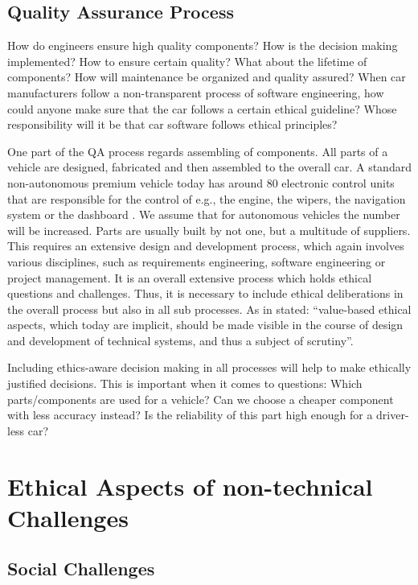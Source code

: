 \subsection{Quality Assurance Process}
\label{sec:EAofTC:QualityAssuranceProcess}

How do engineers ensure high quality components? How is the decision making implemented? How to ensure certain quality? What about the lifetime of components? How will maintenance be organized and quality assured?
When car manufacturers follow a non-transparent process of software engineering, how could anyone make sure that the car follows a certain ethical guideline? Whose responsibility will it be that car software follows ethical principles?

One part of the QA process regards assembling of components. All parts of a vehicle are designed, fabricated and then assembled to the overall car. A standard non-autonomous premium vehicle today has around 80 electronic control units that are responsible for the control of e.g., the engine, the wipers, the navigation system or the dashboard \cite{BoschGmbH2013}. We assume that for autonomous vehicles the number will be increased. Parts are usually built by not one, but a multitude of suppliers. This requires an extensive design and development process, which again involves various disciplines, such as requirements engineering, software engineering or project management. It is an overall extensive process which holds ethical questions and challenges. Thus, it is necessary to include ethical deliberations in the overall process but also in all sub processes. As in \cite{Sapienza2016a} stated: \enquote{value-based ethical aspects, which today are implicit, should be made visible in the course of design and development of technical systems, and thus a subject of scrutiny}. 

Including ethics-aware decision making in all processes will help to make ethically justified decisions. This is important when it comes to questions: Which parts/components are used for a vehicle? Can we choose a cheaper component with less accuracy instead? Is the reliability of this part high enough for a driver-less car?



\section{Ethical Aspects of non-technical Challenges}
\label{sec:EAofNONTC}

\subsection{Social Challenges}
\label{sec:EAofNONTC:SocialChallenges}

